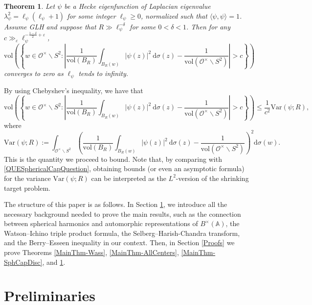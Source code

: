 \documentclass[11pt]{amsart}
\newtheorem{theorem}{Theorem}[section]
\theoremstyle{definition}
\begin{document}
\begin{theorem}\label{MainThm-AlmostAllCenters}
Let $\psi$ be a Hecke eigenfunction of Laplacian eigenvalue $\lambda_{\psi}^2 = \ell_{\psi}(\ell_{\psi}+1)$ for some integer $\ell_{\psi}\geq 0$, normalized such that $\langle \psi, \psi\rangle = 1$. Assume GLH and suppose that $R \gg \ell_{\psi}^{-\delta}$ for some $0<\delta < 1$. Then for any $c \gg_{\varepsilon} \ell_{\psi}^{-\frac{1-\delta}{2} + \varepsilon}$, $$ \mathrm{vol}\left( \left\{ w\in \mathcal{O}^{\times} \backslash S^2 : \left| \frac{1}{\mathrm{vol}(B_R)} \int_{B_R(w)} |\psi(z)|^2 \: \mathrm{d}\sigma(z) - \frac{1}{\mathrm{vol}(\mathcal{O}^{\times} \backslash S^2)} \right| > c \right\} \right) $$ converges to zero as $\ell_{\psi}$ tends to infinity.
\end{theorem}

By using Chebyshev's inequality, we have that $$ \mathrm{vol}\left( \left\{ w\in \mathcal{O}^{\times} \backslash S^2 : \left| \frac{1}{\mathrm{vol}(B_R)} \int_{B_R(w)} |\psi(z)|^2 \: \mathrm{d}\sigma(z) - \frac{1}{\mathrm{vol}(\mathcal{O}^{\times} \backslash S^2)} \right| > c \right\} \right) \leq \frac{1}{c^2} \mathrm{Var}(\psi; R),$$ where $$ \mathrm{Var}(\psi; R) := \int_{\mathcal{O}^{\times} \backslash S^2} \left( \frac{1}{\mathrm{vol}(B_R)} \int_{B_R(w)} |\psi(z)|^2 \: \mathrm{d}\sigma(z) - \frac{1}{\mathrm{vol}(\mathcal{O}^{\times} \backslash S^2)} \right)^2 \mathrm{d}\sigma(w).$$ This is the quantity we proceed to bound. Note that, by comparing with \eqref{QUESphericalCapQuestion}, obtaining bounds (or even an asymptotic formula) for the variance $\mathrm{Var}(\psi;R)$ can be interpreted as the $L^2$-version of the shrinking target problem.

The structure of this paper is as follows. In Section \ref{Preliminaries}, we introduce all the necessary background needed to prove the main results, such as the connection between spherical harmonics and automorphic representations of $B^{\times}(\mathbb{A})$, the Watson--Ichino triple product formula, the Selberg--Harish-Chandra transform, and the Berry--Esseen inequality in our context. Then, in Section \ref{Proofs} we prove Theorems \ref{MainThm-Wass}, \ref{MainThm-AllCenters}, \ref{MainThm-SphCapDisc}, and \ref{MainThm-AlmostAllCenters}.









\section{Preliminaries}\label{Preliminaries}
\end{document}

